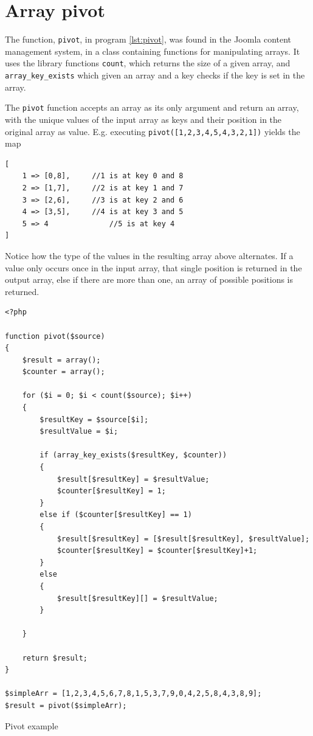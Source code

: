 \section{Array pivot}
The function, \texttt{pivot}, in program \ref{lst:pivot}, was found in the Joomla content management system, in a class containing functions for manipulating arrays. It uses the library functions \texttt{count}, which returns the size of a given array, and \texttt{array\_key\_exists} which given an array and a key checks if the key is set in the array. 

The \texttt{pivot} function accepts an array as its only argument and return an array, with the unique values of the input array as keys and their position in the original array as value. E.g. executing \texttt{pivot([1,2,3,4,5,4,3,2,1])} yields the map
\begin{lstlisting}[style=nonumbers]
[
	1 => [0,8], 	//1 is at key 0 and 8
	2 => [1,7], 	//2 is at key 1 and 7
	3 => [2,6], 	//3 is at key 2 and 6
	4 => [3,5], 	//4 is at key 3 and 5
	5 => 4  			//5 is at key 4
]
\end{lstlisting}
Notice how the type of the values in the resulting array above alternates. If a value only occurs once in the input array, that single position is returned in the output array, else  if there are more than one, an array of possible positions is returned.
\begin{program}
\begin{lstlisting}
<?php

function pivot($source)
{
    $result = array();
    $counter = array();

    for ($i = 0; $i < count($source); $i++)
    {
        $resultKey = $source[$i];
        $resultValue = $i;

        if (array_key_exists($resultKey, $counter))
        {
            $result[$resultKey] = $resultValue;
            $counter[$resultKey] = 1;
        }
        else if ($counter[$resultKey] == 1)
        {
            $result[$resultKey] = [$result[$resultKey], $resultValue];
            $counter[$resultKey] = $counter[$resultKey]+1;
        }
        else
        {
            $result[$resultKey][] = $resultValue;
        }

    }

    return $result;
}

$simpleArr = [1,2,3,4,5,6,7,8,1,5,3,7,9,0,4,2,5,8,4,3,8,9];
$result = pivot($simpleArr);
\end{lstlisting}
\caption{Pivot example}
\label{lst:pivot}
\end{program}

